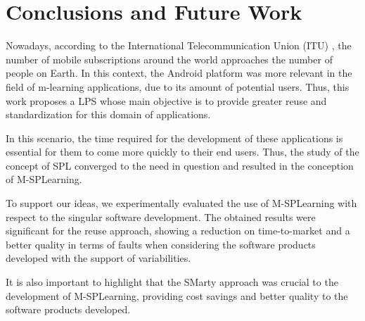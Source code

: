 \section{Conclusions and Future Work}\label{section7}

Nowadays, according to the International Telecommunication Union (ITU) \cite{itu14}, the number of mobile subscriptions around the world approaches the number of people on Earth. In this context, the Android platform was more relevant in the field of m-learning applications, due to its amount of potential users. Thus, this work proposes a LPS whose main objective is to provide greater reuse and standardization for this domain of applications.


In this scenario, the time required for the development of these applications is essential for them to come more quickly to their end users. Thus, the study of the concept of SPL converged to the need in question and resulted in the conception of M-SPLearning.

To support our ideas, we experimentally evaluated the use of M-SPLearning with respect to the singular software development. The obtained results were significant for the reuse approach, showing a reduction on time-to-market and a better quality in terms of faults when considering the software products developed with the support of variabilities. 

It is also important to highlight that the SMarty approach was crucial to the development of M-SPLearning, providing cost savings and better quality to the software products developed.

